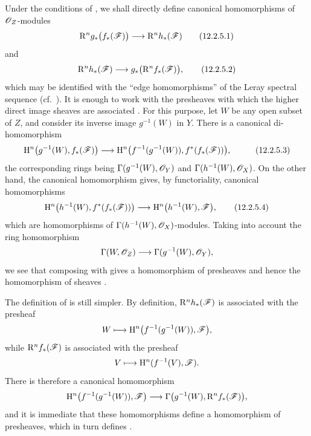 \begin{env}[12.2.5]
\label{0.12.2.5}
Under the conditions of , we shall directly define
canonical homomorphisms of $\mathscr{O}_Z$-modules
\[
  \mathrm{R}^n g_*\bigl(f_*(\mathscr{F})\bigr)
  \longrightarrow\mathrm{R}^n h_*(\mathscr{F})
  \tag{12.2.5.1}
  \label{0.12.2.5.1}
\]
and
\[
  \mathrm{R}^n h_*(\mathscr{F})
  \longrightarrow g_*\bigl(\mathrm{R}^n f_*(\mathscr{F})\bigr),
  \tag{12.2.5.2}
  \label{0.12.2.5.2}
\]
which may be identified with the ``edge homomorphisms'' of the Leray
spectral sequence (cf.\ ).
It is enough to work with the presheaves with which the higher direct
image sheaves are associated .
For this purpose, let $W$ be any open subset of $Z$, and consider its
inverse image $g^{-1}(W)$ in $Y$.  There is a canonical
di-homomorphism
\[
  \begin{aligned}
  \mathrm{H}^n\bigl(g^{-1}(W),f_*(\mathscr{F})\bigr)
  &\longrightarrow
  \mathrm{H}^n\bigl(f^{-1}(g^{-1}(W)),
    f^*(f_*(\mathscr{F}))\bigr),
  \end{aligned}
  \tag{12.2.5.3}
  \label{0.12.2.5.3}
\]
the corresponding rings being
$\Gamma(g^{-1}(W),\mathscr{O}_Y)$ and
$\Gamma(h^{-1}(W),\mathscr{O}_X)$.
On the other hand, the canonical homomorphism
 gives, by functoriality,
canonical homomorphisms
\[
  \mathrm{H}^n\bigl(h^{-1}(W),f^*(f_*(\mathscr{F}))\bigr)
  \longrightarrow
  \mathrm{H}^n\bigl(h^{-1}(W),\mathscr{F}\bigr),
  \tag{12.2.5.4}
  \label{0.12.2.5.4}
\]
which are homomorphisms of
$\Gamma(h^{-1}(W),\mathscr{O}_X)$-modules.
Taking into account the ring homomorphism
\[
  \Gamma(W,\mathscr{O}_Z)
  \longrightarrow\Gamma(g^{-1}(W),\mathscr{O}_Y),
\]
we see that composing  with
 gives a homomorphism of presheaves and hence the
homomorphism of sheaves .

The definition of  is still simpler.
By definition, $\mathrm{R}^n h_*(\mathscr{F})$ is associated with the presheaf
\[
  W\longmapsto
  \mathrm{H}^n\bigl(f^{-1}(g^{-1}(W)),\mathscr{F}\bigr),
\]
while $\mathrm{R}^n f_*(\mathscr{F})$ is associated with the presheaf
\[
  V\longmapsto\mathrm{H}^n(f^{-1}(V),\mathscr{F}).
\]
There is therefore a canonical homomorphism
\[
  \mathrm{H}^n\bigl(f^{-1}(g^{-1}(W)),\mathscr{F}\bigr)
  \longrightarrow
  \Gamma\bigl(g^{-1}(W),\mathrm{R}^n f_*(\mathscr{F})\bigr),
\]
and it is immediate that these homomorphisms define a homomorphism of
presheaves, which in turn defines .
\end{env}

